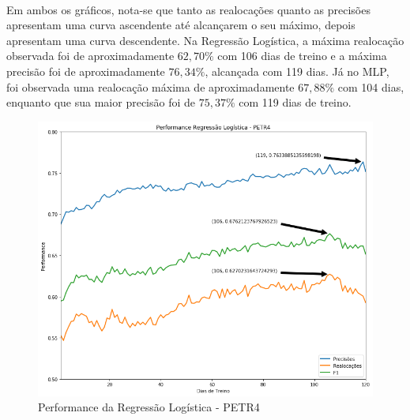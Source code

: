 \documentclass[grad,numbers]{coppe}
\begin{document}
            \paragraph{}Em ambos os gráficos, nota-se que tanto as realocações quanto as precisões apresentam uma curva ascendente até alcançarem o seu máximo, depois apresentam uma curva descendente. Na Regressão Logística, a máxima realocação observada foi de aproximadamente $62,70\%$ com 106 dias de treino e a máxima precisão foi de aproximadamente $76,34\%$, alcançada com 119 dias. Já no MLP, foi observada uma realocação máxima de aproximadamente $67,88\%$ com 104 dias, enquanto que sua maior precisão foi de $75,37\%$ com 119 dias de treino.
            
            \begin{figure}[h!]
                \caption{Performance da Regressão Logística - PETR4}
                \label{img:performance-logreg}
                \includegraphics[width=13.1cm]{performance-logreg.png}
                \centering
            \end{figure}
            
\end{document}
